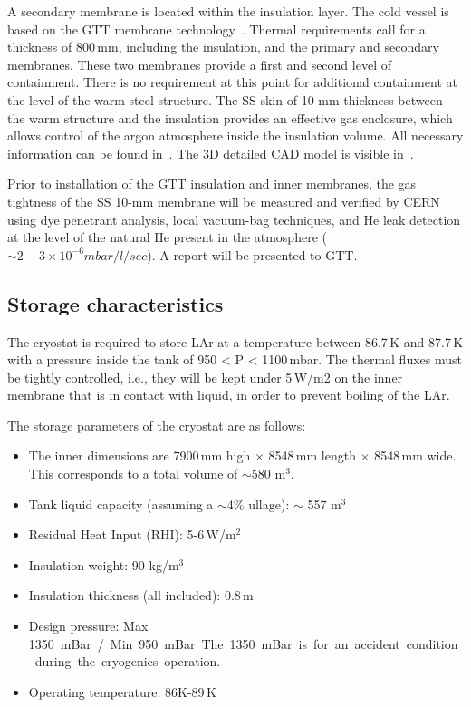 A secondary membrane is located within the insulation layer. The cold vessel is based on the GTT membrane technology~\cite{gtt}.   Thermal requirements call for 
a thickness of 800\,mm, including the insulation, and the primary and secondary membranes. These two membranes provide a first and second level of containment. There is no requirement at this point for additional containment at the level of the warm steel structure. The SS skin of 10-mm thickness between the warm structure and the insulation provides an effective gas enclosure, which allows control of the argon atmosphere inside the insulation volume.
All necessary information can be found in~\cite{edms1}. 
The 3D detailed CAD model is visible in~\cite{edms2}. 

Prior to installation of the GTT insulation and %
inner membranes, the gas tightness of the SS 10-mm membrane will be measured and verified by CERN using dye penetrant analysis, local vacuum-bag techniques, and He leak %
detection at the level of the natural He present in the atmosphere ($\sim2-3 \times 10^{-6} mbar/l/sec$). A report will be presented to GTT.

\subsection{Storage characteristics}


The 
cryostat is required to store LAr at a temperature between 86.7\,K and 87.7\,K with a pressure inside the 
tank of 950 < P < 1100\,mbar. %
The thermal fluxes must be tightly controlled, i.e., %
they will be kept under 5\,W/m2 on %
the inner membrane that is in contact with liquid, in order to prevent boiling of the LAr.

The storage parameters of the cryostat are as follows:
\begin{itemize} %
\item The inner dimensions are 7900\,mm high $\times$ 8548\,mm length $\times$ 8548\,mm wide.  This corresponds to a total volume of $\sim$580 m$^3$. 
\item Tank liquid capacity (assuming a $\sim$4\% ullage): $\sim$ 557 m$^3$
\item Residual Heat Input (RHI): 5-6\,W/m$^2$
\item Insulation weight: 90 kg/m$^3$  
\item Insulation thickness (all included): 0.8\,m 
\item Design pressure: Max \SI{1350} mBar / Min 950 mBar.  The \SI{1350} mBar is for an accident condition during the cryogenics operation.
\item Operating temperature: 86K-89\,K
\end{itemize}

